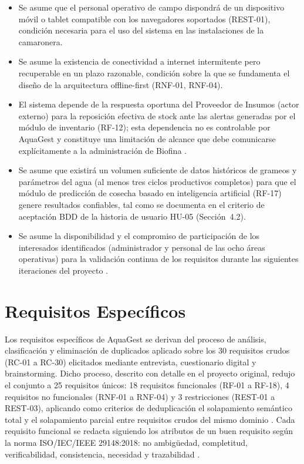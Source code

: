 \documentclass[12pt,a4paper]{article}
\begin{document}
\begin{itemize}[nosep]
  \item Se asume que el personal operativo de campo dispondrá de un
        dispositivo móvil o tablet compatible con los navegadores soportados
        (REST-01), condición necesaria para el uso del sistema en las
        instalaciones de la camaronera.
  \item Se asume la existencia de conectividad a internet intermitente pero
        recuperable en un plazo razonable, condición sobre la que se
        fundamenta el diseño de la arquitectura offline-first (RNF-01,
        RNF-04).
  \item El sistema depende de la respuesta oportuna del Proveedor de Insumos
        (actor externo) para la reposición efectiva de stock ante las alertas
        generadas por el módulo de inventario (RF-12); esta dependencia no es
        controlable por AquaGest y constituye una limitación de alcance que
        debe comunicarse explícitamente a la administración de Biofina
        \cite{Yu1995}.
  \item Se asume que existirá un volumen suficiente de datos históricos de
        grameos y parámetros del agua (al menos tres ciclos productivos
        completos) para que el módulo de predicción de cosecha basado en
        inteligencia artificial (RF-17) genere resultados confiables, tal
        como se documenta en el criterio de aceptación BDD de la historia de
        usuario HU-05 (Sección~4.2).
  \item Se asume la disponibilidad y el compromiso de participación de los
        interesados identificados (administrador y personal de las ocho áreas
        operativas) para la validación continua de los requisitos durante las
        siguientes iteraciones del proyecto \cite{PMI2021}.
\end{itemize}


\section{Requisitos Específicos}

Los requisitos específicos de AquaGest se derivan del proceso de análisis,
clasificación y eliminación de duplicados aplicado sobre los 30 requisitos
crudos (RC-01 a RC-30) elicitados mediante entrevista, cuestionario digital y
brainstorming. Dicho proceso, descrito con detalle en el proyecto original,
redujo el conjunto a 25 requisitos únicos: 18 requisitos funcionales (RF-01 a
RF-18), 4 requisitos no funcionales (RNF-01 a RNF-04) y 3 restricciones
(REST-01 a REST-03), aplicando como criterios de deduplicación el solapamiento
semántico total y el solapamiento parcial entre requisitos crudos del mismo
dominio \cite{ISO29148:2018,SWEBOK2024}. Cada requisito funcional se redacta
siguiendo los atributos de un buen requisito según la norma
ISO/IEC/IEEE 29148:2018: no ambigüedad, completitud, verificabilidad,
consistencia, necesidad y trazabilidad \cite{ISO29148:2018,Pohl2010}.
\end{document}
